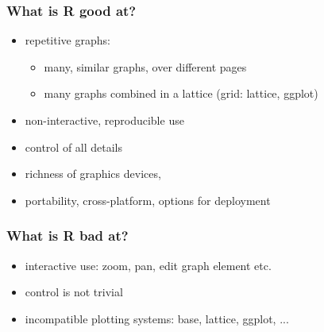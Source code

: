 \documentclass[xcolor=table, xcolor=dvipsnames]{beamer}\usepackage[]{graphicx}\usepackage[]{color}
\newcounter{exercisecount}
\begin{document}





\begin{frame}[fragile]\frametitle{What is R good at?}
\pause
\begin{itemize}[<+->]
\item repetitive graphs:
  \begin{itemize}
  \item many, similar graphs, over different pages
  \item many graphs combined in a lattice (grid: lattice, ggplot)
  \end{itemize}
\item non-interactive, reproducible use
\item control of all details
\item richness of graphics devices,
\item portability, cross-platform, options for deployment
\end{itemize}
\end{frame}


\begin{frame}[fragile]\frametitle{What is R bad at?}
\pause
\begin{itemize}[<+->]
\item interactive use: zoom, pan, edit graph element etc.
\item control is not trivial
\item incompatible plotting systems: base, lattice, ggplot, ...
\end{itemize}
\end{frame}



\end{document}
